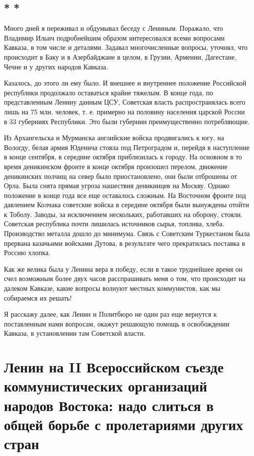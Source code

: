 \documentclass[12pt, a4paper, openany]{book}
\begin{document}
\subsection*{\center * * *}

Много дней я переживал и обдумывал беседу с Лениным. Поражало, что Владимир Ильич подробнейшим образом интересовался всеми вопросами Кавказа, в том числе и деталями. Задавал многочисленные вопросы, уточнял, что происходит в Баку и в Азербайджане в целом, в Грузии, Армении, Дагестане, Чечне и у других народов Кавказа.

Казалось, до этого ли ему было. И внешнее и внутреннее положение Российской республики продолжало оставаться крайне тяжелым. В конце года, по представленным Ленину данным ЦСУ, Советская власть распространялась всего лишь на 75 млн. человек, т. е. примерно на половину населения царской России в 33 губерниях Республики. Это были губернии преимущественно потребляющие.

Из Архангельска и Мурманска английские войска продвигались к югу, на Вологду, белая армия Юденича стояла под Петроградом и, перейдя в наступление в конце сентября, в середине октября приблизилась к городу. На основном в то время деникинском фронте в конце октября произошел перелом, движение деникинских полчищ на север было приостановлено, они были отброшены от Орла. Была снята прямая угроза нашествия деникинцев на Москву. Однако положение в конце года все еще оставалось сложным. На Восточном фронте под давлением Колчака советские войска в середине октября были вынуждены отойти к Тоболу. Заводы, за исключением нескольких, работавших на оборону, стояли. Советская республика почти лишилась источников сырья, топлива, хлеба. Производство металла дошло до минимума. Связь с Советским Туркестаном была прервана казачьими войсками Дутова, в результате чего прекратилась поставка в Россию хлопка.

Как же велика была у Ленина вера в победу, если в такое труднейшее время он счел возможным более двух часов расспрашивать меня о том, что происходит на далеком Кавказе, какие вопросы волнуют местных коммунистов, как мы собираемся их решать!

Я расскажу далее, как Ленин и Политбюро не один раз еще вернутся к поставленным нами вопросам, окажут решающую помощь в освобождении Кавказа, в установлении там Советской власти.

\newpage
\section[Ленин на II Всероссийском съезде коммунистических организаций народов Востока: надо слиться в общей борьбе с пролетариями других стран]{\center \textbf{Ленин на II Всероссийском съезде коммунистических организаций народов Востока: надо слиться в общей борьбе с пролетариями других стран}}
\end{document}
